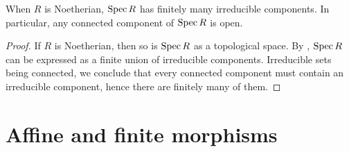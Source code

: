 \documentclass[a4paper,parskip=half,numbers=enddot, DIV=12]{scrreprt}
\begin{document}
\begin{lem}
	When $R$ is Noetherian, $\operatorname{Spec} R$ has finitely many irreducible components. In particular, any connected component of $\operatorname{Spec} R$ is open.
\end{lem}
\begin{proof}
	If $R$ is Noetherian, then so is $\operatorname{Spec} R$ as a topological space. By \cite[Proposition~2.1.1]{alg1}, $\operatorname{Spec} R$ can be expressed as a finite union of irreducible components. Irreducible sets being connected, we conclude that every connected component must contain an irreducible component, hence there are finitely many of them.
\end{proof}

\section{Affine and finite morphisms}
\end{document}
